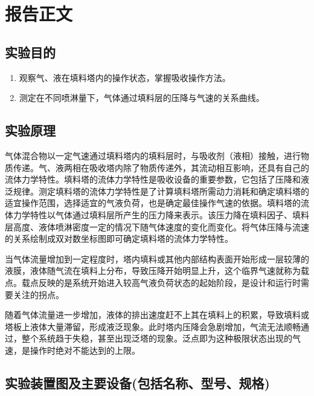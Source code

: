 \documentclass[a4paper,UTF8]{ctexrep}
\theoremstyle{plain}
\theoremstyle{definition}
\numberwithin{equation}{chapter}
\begin{document}
	
	

        \chapter{报告正文}
	\section{实验目的}
	\begin{enumerate}
            \item  观察⽓、液在填料塔内的操作状态，掌握吸收操作⽅法。
            \item  测定在不同喷淋量下，⽓体通过填料层的压降与⽓速的关系曲线。
	\end{enumerate}

        \section{实验原理}

        ⽓体混合物以⼀定⽓速通过填料塔内的填料层时，与吸收剂（液相）接触，进⾏物质传递。⽓、液两相在吸收塔内除了物质传递外，其流动相互影响，还具有⾃⼰的流体⼒学特性。填料塔的流体⼒学特性是吸收设备的重要参数，它包括了压降和液泛规律。测定填料塔的流体⼒学特性是了计算填料塔所需动⼒消耗和确定填料塔的适宜操作范围，选择适宜的⽓液负荷，也是确定最佳操作⽓速的依据。填料塔的流体⼒学特性以⽓体通过填料层所产⽣的压⼒降来表⽰。该压⼒降在填料因⼦、填料层⾼度、液体喷淋密度⼀定的情况下随⽓体速度的变化⽽变化。将气体压降与流速的关系绘制成双对数坐标图即可确定填料塔的流体⼒学特性。

        当气体流量增加到一定程度时，塔内填料或其他内部结构表面开始形成一层较薄的液膜，液体随气流在填料上分布，导致压降开始明显上升，这个临界气速就称为载点。载点反映的是系统开始进入较高气液负荷状态的起始阶段，是设计和运行时需要关注的拐点。

        随着气体流量进一步增加，液体的排出速度赶不上其在填料上的积累，导致填料或塔板上液体大量滞留，形成液泛现象。此时塔内压降会急剧增加，气流无法顺畅通过，整个系统趋于失稳，甚至出现泛塔的现象。泛点即为这种极限状态出现的气速，是操作时绝对不能达到的上限。

        \section{实验装置图及主要设备(包括名称、型号、规格)}
\end{document}
